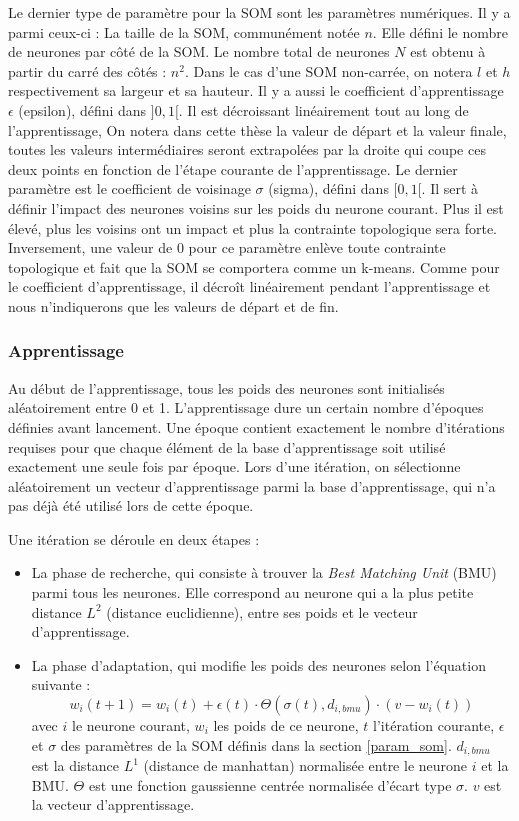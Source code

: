 	Le dernier type de paramètre pour la SOM sont les paramètres numériques. Il y a parmi ceux-ci : La taille de la SOM, communément notée $n$. Elle défini le nombre de neurones par côté de la SOM. Le nombre total de neurones $N$ est obtenu à partir du carré des côtés : $n^2$. Dans le cas d'une SOM non-carrée, on notera $l$ et $h$ respectivement sa largeur et sa hauteur. Il y a aussi le coefficient d'apprentissage $\epsilon$ (epsilon), défini dans $]0,1[$. Il est décroissant linéairement tout au long de l'apprentissage, On notera dans cette thèse la valeur de départ et la valeur finale, toutes les valeurs intermédiaires seront extrapolées par la droite qui coupe ces deux points en fonction de l'étape courante de l'apprentissage. Le dernier paramètre est le coefficient de voisinage $\sigma$ (sigma), défini dans $[0,1[$. Il sert à définir l'impact des neurones voisins sur les poids du neurone courant. Plus il est élevé, plus les voisins ont un impact et plus la contrainte topologique sera forte. Inversement, une valeur de 0 pour ce paramètre enlève toute contrainte topologique et fait que la SOM se comportera comme un k-means. Comme pour le coefficient d'apprentissage, il décroît linéairement pendant l'apprentissage et nous n'indiquerons que les valeurs de départ et de fin.

\subsubsection{Apprentissage}

	Au début de l'apprentissage, tous les poids des neurones sont initialisés aléatoirement entre 0 et 1. L'apprentissage dure un certain nombre d'époques définies avant lancement. Une époque contient exactement le nombre d'itérations requises pour que chaque élément de la base d'apprentissage soit utilisé exactement une seule fois par époque. Lors d'une itération, on sélectionne aléatoirement un vecteur d'apprentissage parmi la base d'apprentissage, qui n'a pas déjà été utilisé lors de cette époque. 

	Une itération se déroule en deux étapes : 
	\begin{itemize}
		\item La phase de recherche, qui consiste à trouver la \textit{Best Matching Unit} (BMU) parmi tous les neurones. Elle correspond au neurone qui a la plus petite distance $L^2$ (distance euclidienne), entre ses poids et le vecteur d'apprentissage.
		\item La phase d'adaptation, qui modifie les poids des neurones selon l'équation suivante :
		\begin{equation}\label{eq:SOM}
			w_i(t+1) = w_i(t)+\epsilon(t)\cdot\Theta(\sigma(t),d_{i,bmu})\cdot(v-w_i(t))
		\end{equation} avec $i$ le neurone courant, $w_i$ les poids de ce neurone, $t$ l'itération courante, $\epsilon$ et $\sigma$ des paramètres de la SOM définis dans la section \ref{param_som}. $d_{i, bmu}$ est la distance $L^1$ (distance de manhattan) normalisée entre le neurone $i$ et la BMU. $\Theta$ est une fonction gaussienne centrée normalisée d'écart type $\sigma$. $v$ est la vecteur d'apprentissage.
	\end{itemize}

